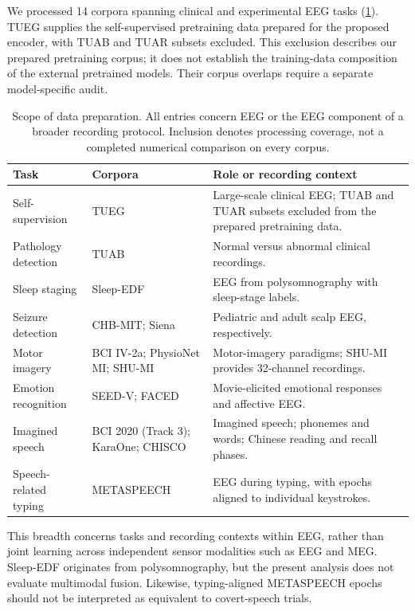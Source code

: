 \documentclass{article}
\begin{document}
We processed 14 corpora spanning clinical and experimental EEG tasks
(\cref{tab:datasets}). TUEG supplies the self-supervised pretraining data
prepared for the proposed encoder, with TUAB and TUAR subsets excluded.
This exclusion describes our prepared pretraining corpus; it does not
establish the training-data composition of the external pretrained models.
Their corpus overlaps require a separate model-specific audit.

\begin{table}[t]
\centering
\caption{Scope of data preparation. All entries concern EEG or the EEG
component of a broader recording protocol. Inclusion denotes processing
coverage, not a completed numerical comparison on every corpus.}
\label{tab:datasets}
\small
\setlength{\tabcolsep}{4pt}
\begin{tabular}{>{\raggedright\arraybackslash}p{}>{\raggedright\arraybackslash}p{}>{\raggedright\arraybackslash}p{}}
\toprule
Task & Corpora & Role or recording context \\
\midrule
Self-supervision & TUEG & Large-scale clinical EEG; TUAB and TUAR subsets excluded from the prepared pretraining data. \\
Pathology detection & TUAB & Normal versus abnormal clinical recordings. \\
Sleep staging & Sleep-EDF & EEG from polysomnography with sleep-stage labels. \\
Seizure detection & CHB-MIT; Siena & Pediatric and adult scalp EEG, respectively. \\
Motor imagery & BCI IV-2a; PhysioNet MI; SHU-MI & Motor-imagery paradigms; SHU-MI provides 32-channel recordings. \\
Emotion recognition & SEED-V; FACED & Movie-elicited emotional responses and affective EEG. \\
Imagined speech & BCI 2020 (Track 3); KaraOne; CHISCO & Imagined speech; phonemes and words; Chinese reading and recall phases. \\
Speech-related typing & METASPEECH & EEG during typing, with epochs aligned to individual keystrokes. \\
\bottomrule
\end{tabular}
\end{table}

This breadth concerns tasks and recording contexts within EEG, rather than
joint learning across independent sensor modalities such as EEG and MEG.
Sleep-EDF originates from polysomnography, but the present analysis does
not evaluate multimodal fusion. Likewise, typing-aligned METASPEECH epochs
should not be interpreted as equivalent to covert-speech trials.
\end{document}
